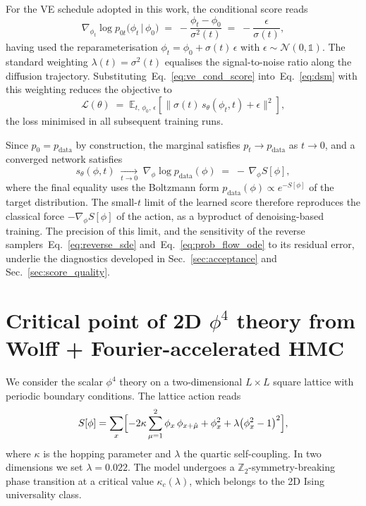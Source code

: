 \documentclass[reprint,twocolumn,superscriptaddress,preprintnumbers,amsmath,amssymb,aps,prd,floatfix]{revtex4-2}
\def\Eq#1{Eq.~\eqref{#1}}
\def\Sec#1{Sec.~\ref{#1}}
\begin{document}
For the VE schedule adopted in this work, the conditional score reads
\begin{equation}
\nabla_{\phi_{t}}\log p_{0t}\bigl(\phi_{t}\,\bigl|\,\phi_{0}\bigr) \;=\; -\frac{\phi_{t}-\phi_{0}}{\sigma^{2}(t)} \;=\; -\frac{\epsilon}{\sigma(t)},
\label{eq:ve_cond_score}
\end{equation}
having used the reparameterisation $\phi_{t}=\phi_{0}+\sigma(t)\,\epsilon$ with $\epsilon\sim\mathcal{N}(0,\mathbb{1})$. The standard weighting $\lambda(t)=\sigma^{2}(t)$ equalises the signal-to-noise ratio along the diffusion trajectory. Substituting~\Eq{eq:ve_cond_score} into~\Eq{eq:dsm} with this weighting reduces the objective to
\begin{equation}
\mathcal{L}(\theta) \;=\; \mathbb{E}_{t,\,\phi_{0},\,\epsilon}\!\left[\bigl\|\sigma(t)\,s_{\theta}(\phi_{t},t)+\epsilon\bigr\|^{2}\right],
\label{eq:dsm_loss_ve}
\end{equation}
the loss minimised in all subsequent training runs.

Since $p_{0}=p_{\text{data}}$ by construction, the marginal satisfies $p_{t}\to p_{\text{data}}$ as $t\to 0$, and a converged network satisfies
\begin{equation}
s_{\theta}(\phi,t)\;\xrightarrow[t\to 0]{}\;\nabla_{\phi}\log p_{\text{data}}(\phi)\;=\;-\,\nabla_{\phi}S[\phi],
\label{eq:score_small_t}
\end{equation}
where the final equality uses the Boltzmann form $p_{\text{data}}(\phi)\propto e^{-S[\phi]}$ of the target distribution. The small-$t$ limit of the learned score therefore reproduces the classical force $-\nabla_{\phi}S[\phi]$ of the action, as a byproduct of denoising-based training. The precision of this limit, and the sensitivity of the reverse samplers~\Eq{eq:reverse_sde} and~\Eq{eq:prob_flow_ode} to its residual error, underlie the diagnostics developed in \Sec{sec:acceptance} and \Sec{sec:score_quality}.


\section{Critical point of 2D \texorpdfstring{$\phi^4$}{phi4} theory from Wolff + Fourier-accelerated HMC}
\label{sec:phi4_critical}

We consider the scalar $\phi^4$ theory on a two-dimensional $L\times L$ square lattice with periodic boundary conditions. The lattice action reads
\begin{equation}
S[\phi] = \sum_{x} \Bigl[
  -2\kappa \sum_{\mu=1}^{2} \phi_x\,\phi_{x+\hat\mu}
  + \phi_x^2 + \lambda\bigl(\phi_x^2 - 1\bigr)^2
\Bigr],
\label{eq:phi4_action}
\end{equation}
where $\kappa$ is the hopping parameter and $\lambda$ the quartic self-coupling. In two dimensions we set $\lambda=0.022$. The model undergoes a $\mathbb{Z}_2$-symmetry-breaking phase transition at a critical value $\kappa_c(\lambda)$, which belongs to the 2D Ising universality class.
\end{document}
